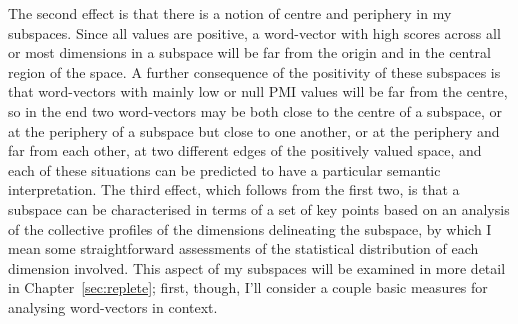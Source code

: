 The second effect is that there is a notion of centre and periphery in my subspaces.  Since all values are positive, a word-vector with high scores across all or most dimensions in a subspace will be far from the origin and in the central region of the space.  A further consequence of the positivity of these subspaces is that word-vectors with mainly low or null PMI values will be far from the centre, so in the end two word-vectors may be both close to the centre of a subspace, or at the periphery of a subspace but close to one another, or at the periphery and far from each other, at two different edges of the positively valued space, and each of these situations can be predicted to have a particular semantic interpretation.  The third effect, which follows from the first two, is that a subspace can be characterised in terms of a set of key points based on an analysis of the collective profiles of the dimensions delineating the subspace, by which I mean some straightforward assessments of the statistical distribution of each dimension involved.  This aspect of my subspaces will be examined in more detail in Chapter~\ref{sec:replete}; first, though, I'll consider a couple basic measures for analysing word-vectors in context.

